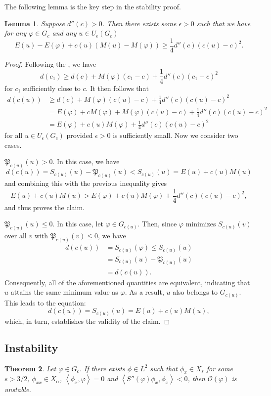 \documentclass[10pt]{article}
\newcommand{\fp}{\mathfrak{P}}
\numberwithin{equation}{section}
\newtheorem{theorem}{\quad Theorem}[section]
\newtheorem{lemma}[theorem]{\quad Lemma}
\newcommand{\ff}{\varphi}
\newcommand{\al}{\alpha}
\begin{document}
	The following lemma is the key step in the stability proof.
	
	\begin{lemma}\label{L:stability_bound} Suppose $d''(c)>0$. Then there exists some $\epsilon>0$ such that  we have for any $\ff\in G_c$ and any $u\in U_\epsilon(G_c)$
		$$E(u)- E(\ff) +c(u)(M(u)-M(\ff))\geq \dfrac{1}{4} d''(c) (c(u)-c)^2.$$
	\end{lemma}
	
	
	
	
	\begin{proof}Following the \cite[Lemma 4.3]{esfahani-levan-dpde}, we have
		\[
		d(c_1) \geq d(c)+M(\ff)(c_1-c)+ \frac{1}{4}d''(c) (c_1- c)^2
		\]
		for $c_1$ sufficiently close to $c$. It then follows that
		\begin{align*}
			d(c(u))&\geq d(c)+M(\ff)(c(u)-c)+\frac{1}{4}d''(c) (c(u)- c)^2\\
			&=E(\ff)+cM(\ff)+M(\ff)(c(u)-c)+\frac{1}{4}d''(c) (c(u)- c)^2\\
			&=E(\ff)+c(u)M(\ff)+\frac{1}{4}d''(c) (c(u)- c)^2
		\end{align*}
		for all $u\in U_\epsilon(G_c)$ provided $\epsilon>0$ is sufficiently small. Now we consider two cases.
		
		 $\fp_{c(u)}(u)>0$. In this case, we have
		\[
		d(c(u))= S_{c(u)}(u)- \fp_{c(u)}(u)< S_{c(u)}(u)
		=E(u)+c(u)M(u)
		\]
		and combining this with the previous inequality gives
		\[
		E(u)+c(u)M(u)> E(\ff)+c(u)M(\ff)+\frac{1}{4}d''(c) (c(u)- c)^2,
		\]
		and thus proves the claim.
		
		 $\fp_{c(u)}(u)\leq0$. In this case, let $\ff\in G_{c(u)}$. Then, since $\ff$ minimizes
		$S_{c(u)}(v)$ over all $v$ with $\fp_{c(u)}(v)\leq0$,  we have  
		\begin{align*}
			d(c(u))&=S_{c(u)}(\ff)\leq S_{c(u)}(u)\\
			&=S_{c(u)}(u)- \fp_{c(u)}(u)\\
			&=d(c(u)).
		\end{align*}
		Consequently, all of the aforementioned quantities are equivalent, indicating that $u$ attains the same minimum value as $\varphi$. As a result, $u$ also belongs to $G_{c(u)}$. This leads to the equation:
		\[
		d(c(u)) = S_{c(u)}(u) = E(u) + c(u)M(u),
		\]
		which, in turn, establishes the validity of the claim.	
	\end{proof}
	\subsection{Instability}
	\begin{theorem}\label{instability} Let $\ff\in G_c$. If there exists $\phi\in L^2$ such that $\phi_x\in X_s$ for some $s>3/2$, $\phi_{xx}\in X_\al$, $\left<\phi_x,\ff\right>=0$ and $\left<S''(\ff)\phi_x,\phi_x\right><0$, then $\mathcal{O}(\ff)$ is unstable.
	\end{theorem}
	
\end{document}
